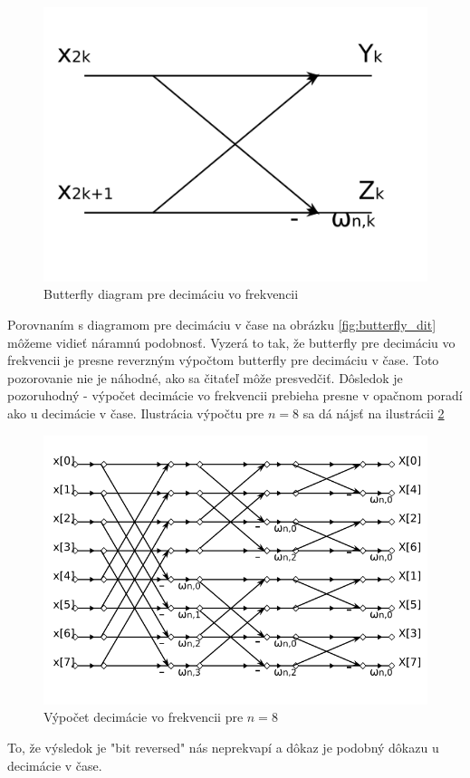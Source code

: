 \begin{figure}[htp]
    \centering
        \includegraphics{obrazky/algoritmy/butterfly_dif}
        \caption{Butterfly diagram pre decimáciu vo frekvencii}
    \label{fig:butterfly_dif}
\end{figure}

Porovnaním s diagramom pre decimáciu v čase na obrázku
\ref{fig:butterfly_dit} môžeme
vidieť náramnú podobnosť. Vyzerá to tak, že butterfly pre decimáciu vo
frekvencii
je presne reverzným výpočtom butterfly pre decimáciu v čase. Toto
pozorovanie nie je náhodné, ako sa čitaťeľ môže presvedčiť. Dôsledok
je pozoruhodný - výpočet decimácie vo frekvencii 
prebieha presne v opačnom poradí
ako u decimácie v čase. Ilustrácia výpočtu pre $n=8$ sa dá nájsť na
ilustrácii \ref{fig:dif}

\begin{figure}[htp]
    \centering
        \includegraphics{obrazky/algoritmy/dif}
        \caption{Výpočet decimácie vo frekvencii pre $n=8$}
    \label{fig:dif}
\end{figure}
To, že výsledok je "bit reversed" nás neprekvapí a dôkaz je podobný
dôkazu u decimácie v čase.


